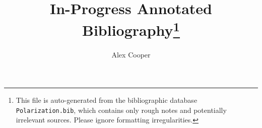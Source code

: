 \documentclass[a4paper,11pt]{article}
\title{In-Progress Annotated Bibliography\thanks{
This file is auto-generated from the bibliographic database 
{\tt Polarization.bib}, which contains only rough notes and 
potentially irrelevant sources. Please 
ignore formatting irregularities.
}}
\author{Alex Cooper}
\begin{document}
\maketitle
\nocite{*}



\end{document}
